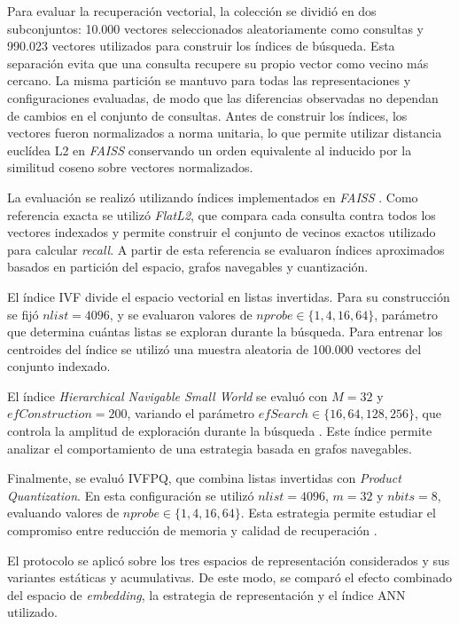 \documentclass[runningheads]{llncs}
\begin{document}
Para evaluar la recuperación vectorial, la colección se dividió en dos subconjuntos: 10.000 vectores seleccionados aleatoriamente como consultas y 990.023 vectores utilizados para construir los índices de búsqueda. Esta separación evita que una consulta recupere su propio vector como vecino más cercano. La misma partición se mantuvo para todas las representaciones y configuraciones evaluadas, de modo que las diferencias observadas no dependan de cambios en el conjunto de consultas. Antes de construir los índices, los vectores fueron normalizados a norma unitaria, lo que permite utilizar distancia euclídea L2 en \textit{FAISS} conservando un orden equivalente al inducido por la similitud coseno sobre vectores normalizados.

La evaluación se realizó utilizando índices implementados en \textit{FAISS} \cite{johnson2021billion}. Como referencia exacta se utilizó \textit{FlatL2}, que compara cada consulta contra todos los vectores indexados y permite construir el conjunto de vecinos exactos utilizado para calcular \textit{recall}. A partir de esta referencia se evaluaron índices aproximados basados en partición del espacio, grafos navegables y cuantización.

El índice IVF divide el espacio vectorial en listas invertidas. Para su construcción se fijó $nlist=4096$, y se evaluaron valores de $nprobe \in \{1,4,16,64\}$, parámetro que determina cuántas listas se exploran durante la búsqueda. Para entrenar los centroides del índice se utilizó una muestra aleatoria de 100.000 vectores del conjunto indexado.

El índice \textit{Hierarchical Navigable Small World} se evaluó con $M=32$ y $efConstruction=200$, variando el parámetro $efSearch \in \{16,64,128,256\}$, que controla la amplitud de exploración durante la búsqueda \cite{malkov2020hnsw}. Este índice permite analizar el comportamiento de una estrategia basada en grafos navegables.

Finalmente, se evaluó IVFPQ, que combina listas invertidas con \textit{Product Quantization}. En esta configuración se utilizó $nlist=4096$, $m=32$ y $nbits=8$, evaluando valores de $nprobe \in \{1,4,16,64\}$. Esta estrategia permite estudiar el compromiso entre reducción de memoria y calidad de recuperación \cite{jegou2011pq}.

El protocolo se aplicó sobre los tres espacios de representación considerados y sus variantes estáticas y acumulativas. De este modo, se comparó el efecto combinado del espacio de \textit{embedding}, la estrategia de representación y el índice ANN utilizado.
\end{document}
